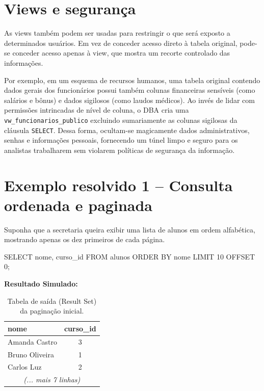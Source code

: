 \section{Views e segurança}

As views também podem ser usadas para restringir o que será exposto a determinados usuários. Em vez de conceder acesso direto à tabela original, pode-se conceder acesso apenas à view, que mostra um recorte controlado das informações.

Por exemplo, em um esquema de recursos humanos, uma tabela original contendo dados gerais dos funcionários possui também colunas financeiras sensíveis (como salários e bônus) e dados sigilosos (como laudos médicos). Ao invés de lidar com permissões intrincadas de nível de coluna, o DBA cria uma \texttt{vw\_funcionarios\_publico} excluindo sumariamente as colunas sigilosas da cláusula \texttt{SELECT}. Dessa forma, ocultam-se magicamente dados administrativos, senhas e informações pessoais, fornecendo um túnel limpo e seguro para os analistas trabalharem sem violarem políticas de segurança da informação.

\section{Exemplo resolvido 1 -- Consulta ordenada e paginada}

Suponha que a secretaria queira exibir uma lista de alunos em ordem alfabética, mostrando apenas os dez primeiros de cada página.

\begin{sqlcode}
SELECT nome, curso_id
FROM alunos
ORDER BY nome
LIMIT 10 OFFSET 0;
\end{sqlcode}

\textbf{Resultado Simulado:}

\begin{table}[H]
    \centering
    \begin{tabular}{|l|c|}
    \hline
    \textbf{nome} & \textbf{curso\_id} \\
    \hline
    Amanda Castro & 3 \\
    Bruno Oliveira & 1 \\
    Carlos Luz & 2 \\
    \multicolumn{2}{|c|}{\textit{(... mais 7 linhas)}} \\
    \hline
    \end{tabular}
    \caption{Tabela de saída (Result Set) da paginação inicial.}
\end{table}

